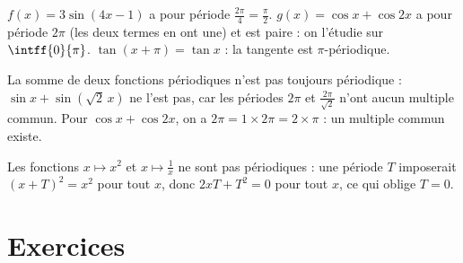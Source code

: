 \begin{example}
$f(x)=3\sin(4x-1)$ a pour période $\frac{2\pi}{4}=\frac\pi2$. $g(x)=\cos x+\cos 2x$ a pour période $2\pi$ (les deux termes en ont une) et est paire : on l'étudie sur $\intff{0}{\pi}$. $\tan(x+\pi)=\tan x$ : la tangente est $\pi$-périodique.
\end{example}
\begin{pitfall}
La somme de deux fonctions périodiques n'est pas toujours périodique : $\sin x+\sin(\sqrt2\,x)$ ne l'est pas, car les périodes $2\pi$ et $\frac{2\pi}{\sqrt2}$ n'ont aucun multiple commun. Pour $\cos x+\cos 2x$, on a $2\pi=1\times2\pi=2\times\pi$ : un multiple commun existe.
\end{pitfall}
\begin{beyond}
Les fonctions $x\mapsto x^2$ et $x\mapsto\frac1x$ ne sont pas périodiques : une période $T$ imposerait $(x+T)^2=x^2$ pour tout $x$, donc $2xT+T^2=0$ pour tout $x$, ce qui oblige $T=0$.
\end{beyond}

\section{Exercices}
